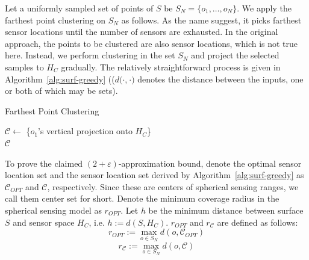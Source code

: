 Let a uniformly sampled set of points of $S$ be $S_N = \{o_1, \ldots, o_N\}$. We apply the farthest point clustering \cite{gonzalez1985clustering} on $S_N$ as follows. As the name suggest, it picks farthest sensor locations until the number of sensors are exhausted. In the original approach, the points to be clustered are also sensor locations, which is not true here. Instead, we perform clustering in the set $S_N$ and project the selected samples to $H_C$ gradually. The relatively straightforward process is given in Algorithm~\ref{alg:surf-greedy} (($d(\cdot$,$\ \cdot)$ denotes the distance between the inputs, one or both of which may be sets).


\begin{algorithm}
\begin{small}
    \caption{Farthest Point Clustering}
		\label{alg:surf-greedy}
    \SetAlgoLined
		\vspace{1mm}
		\vspace{1mm}
        $\mathcal{C} \leftarrow$  \{$o_1$'s vertical projection onto $H_C$\}\\
        \Return $\mathcal{C}$
\end{small}
\end{algorithm}

To prove the claimed $(2+\varepsilon)$-approximation bound,  
denote the optimal sensor location set and the sensor location set derived by Algorithm~\ref{alg:surf-greedy} as $\mathcal{C}_{OPT}$ and $\mathcal{C}$, respectively. Since these are centers of spherical sensing ranges, we call them center set for short. Denote the minimum coverage radius in the spherical sensing model as $r_{OPT}$. Let $h$ be the minimum distance between surface $S$ and sensor space $H_C$, i.e. $h:=d(S,H_C)$. $r_{OPT}$ and $r_{\mathcal{C}}$ are defined as follows:
\begin{equation}
    r_{OPT}:=\max_{o\in S_N} d(o, \mathcal{C}_{OPT})
\end{equation}
\begin{equation}
    r_{\mathcal{C}}:=\max_{o\in S_N} d(o, \mathcal{\mathcal{C}})
\end{equation}

